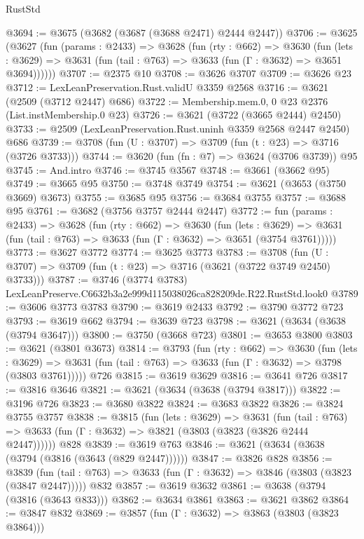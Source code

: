 \begin{lexlean}{RustStd}
\begin{coremodule}
@3694 := @3675 (@3682 (@3687 (@3688 @2471) @2444 @2447))
@3706 := @3625
    (@3627
      (fun (params : @2433) =>
      @3628
        (fun (rty : @662) =>
        @3630
          (fun (lets : @3629) =>
          @3631 (fun (tail : @763) => @3633 (fun (Γ : @3632) => @3651 @3694))))))
@3707 := @2375 @10
@3708 := @3626 @3707
@3709 := @3626 @23
@3712 := LexLeanPreservation.Rust.validU @3359 @2568
@3716 := @3621 (@2509 (@3712 @2447) @686)
@3722 := Membership.mem.{0, 0} @23 @2376 (List.instMembership.{0} @23)
@3726 := @3621 (@3722 (@3665 @2444) @2450)
@3733 := @2509 (LexLeanPreservation.Rust.uninh @3359 @2568 @2447 @2450) @686
@3739 := @3708 (fun (U : @3707) => @3709 (fun (t : @23) => @3716 (@3726 @3733)))
@3744 := @3620 (fun (fn : @7) => @3624 (@3706 @3739)) @95
@3745 := And.intro
@3746 := @3745 @3567
@3748 := @3661 (@3662 @95)
@3749 := @3665 @95
@3750 := @3748 @3749
@3754 := @3621 (@3653 (@3750 @3669) @3673)
@3755 := @3685 @95
@3756 := @3684 @3755
@3757 := @3688 @95
@3761 := @3682 (@3756 @3757 @2444 @2447)
@3772 := fun (params : @2433) =>
  @3628
    (fun (rty : @662) =>
    @3630
      (fun (lets : @3629) =>
      @3631 (fun (tail : @763) => @3633 (fun (Γ : @3632) => @3651 (@3754 @3761)))))
@3773 := @3627 @3772
@3774 := @3625 @3773
@3783 := @3708 (fun (U : @3707) => @3709 (fun (t : @23) => @3716 (@3621 (@3722 @3749 @2450) @3733)))
@3787 := @3746 (@3774 @3783) LexLeanPreserve.C6632b3a2e999d115038026ca828209de.R22.RustStd.look0
@3789 := @3606 @3773 @3783
@3790 := @3619 @2433
@3792 := @3790 @3772 @723
@3793 := @3619 @662
@3794 := @3639 @723
@3798 := @3621 (@3634 (@3638 (@3794 @3647)))
@3800 := @3750 (@3668 @723)
@3801 := @3653 @3800
@3803 := @3621 (@3801 @3673)
@3814 := @3793
    (fun (rty : @662) =>
    @3630
      (fun (lets : @3629) =>
      @3631 (fun (tail : @763) => @3633 (fun (Γ : @3632) => @3798 (@3803 @3761)))))
    @726
@3815 := @3619 @3629
@3816 := @3641 @726
@3817 := @3816 @3646
@3821 := @3621 (@3634 (@3638 (@3794 @3817)))
@3822 := @3196 @726
@3823 := @3680 @3822
@3824 := @3683 @3822
@3826 := @3824 @3755 @3757
@3838 := @3815
    (fun (lets : @3629) =>
    @3631
      (fun (tail : @763) => @3633 (fun (Γ : @3632) => @3821 (@3803 (@3823 (@3826 @2444 @2447))))))
    @828
@3839 := @3619 @763
@3846 := @3621 (@3634 (@3638 (@3794 (@3816 (@3643 (@829 @2447))))))
@3847 := @3826 @828
@3856 := @3839
    (fun (tail : @763) => @3633 (fun (Γ : @3632) => @3846 (@3803 (@3823 (@3847 @2447)))))
    @832
@3857 := @3619 @3632
@3861 := @3638 (@3794 (@3816 (@3643 @833)))
@3862 := @3634 @3861
@3863 := @3621 @3862
@3864 := @3847 @832
@3869 := @3857 (fun (Γ : @3632) => @3863 (@3803 (@3823 @3864)))

\end{coremodule}
\end{lexlean}
